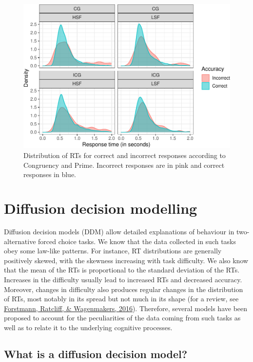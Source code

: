 \documentclass[
  11pt,
  english,
  ,doc,floatsintext]{apa6}
\begin{document}
\begin{figure}[!htb]

{\centering \includegraphics[width=0.75\linewidth]{supplementary_materials_files/figure-latex/correctness2-1} 

}

\caption{Distribution of RTs for correct and incorrect responses according to Congruency and Prime. Incorrect responses are in pink and correct responses in blue.}\label{fig:correctness2}
\end{figure}

\newpage

\hypertarget{diffusion-decision-modelling}{%
\section{Diffusion decision modelling}\label{diffusion-decision-modelling}}

Diffusion decision models (DDM) allow detailed explanations of behaviour in two-alternative forced choice tasks. We know that the data collected in such tasks obey some law-like patterns. For instance, RT distributions are generally positively skewed, with the skewness increasing with task difficulty. We also know that the mean of the RTs is proportional to the standard deviation of the RTs. Increases in the difficulty usually lead to increased RTs and decreased accuracy. Moreover, changes in difficulty also produces regular changes in the distribution of RTs, most notably in its spread but not much in its shape (for a review, see \protect\hyperlink{ref-forstmann_sequential_2016}{Forstmann, Ratcliff, \& Wagenmakers, 2016}). Therefore, several models have been proposed to account for the peculiarities of the data coming from such tasks as well as to relate it to the underlying cognitive processes.

\hypertarget{what-is-a-diffusion-decision-model}{%
\subsection{What is a diffusion decision model?}\label{what-is-a-diffusion-decision-model}}
\end{document}
